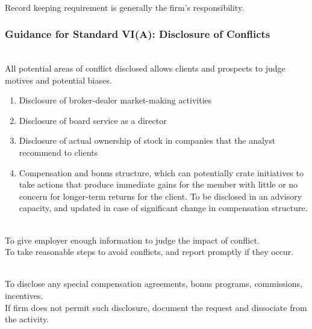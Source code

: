 \begin{remark} \\
Record keeping requirement is generally the firm's responsibility.
\end{remark}

\subsubsection{Guidance for Standard VI(A): Disclosure of Conflicts}

\begin{remark} \\
All potential areas of conflict disclosed allows clients and prospects to judge motives and potential biases.
\begin{enumerate}[label=\roman*.]
\setlength{\itemsep}{0pt}
\item Disclosure of broker-dealer market-making activities
\item Disclosure of board service as a director
\item Disclosure of actual ownership of stock in companies that the analyst recommend to clients
\item Compensation and bonus structure, which can potentially crate initiatives to take actions that produce immediate gains for the member with little or no concern for longer-term returns for the client. To be disclosed in an advisory capacity, and updated in case of significant change in compensation structure.
\end{enumerate}
\end{remark}

\begin{remark} \\
To give employer enough information to judge the impact of conflict.\\
To take reasonable steps to avoid conflicts, and report promptly if they occur.
\end{remark}

\begin{remark} \\
To disclose any special compensation agreements, bonus programs, commissions, incentives.\\
If firm does not permit such disclosure, document the request and dissociate from the activity.
\end{remark}

